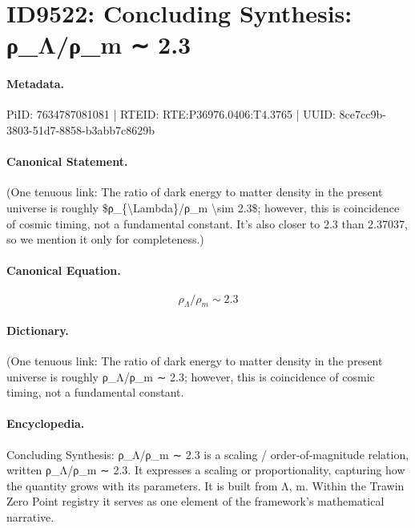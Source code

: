 \section*{ID9522: Concluding Synthesis: ρ\_Λ/ρ\_m ∼ 2.3}
\paragraph{Metadata.}
PiID: 7634787081081 | RTEID: RTE:P36976.0406:T4.3765 | UUID: 8ce7cc9b-3803-51d7-8858-b3abb7c8629b

\paragraph{Canonical Statement.}
(One tenuous link: The ratio of dark energy to matter density in the present universe is roughly \$ρ\_\{\textbackslash{}Lambda\}/ρ\_m \textbackslash{}sim 2.3\$; however, this is coincidence of cosmic timing, not a fundamental constant. It’s also closer to 2.3 than 2.37037, so we mention it only for completeness.)

\paragraph{Canonical Equation.}
\[
ρ_{\Lambda}/ρ_m \sim 2.3
\]

\paragraph{Dictionary.}
(One tenuous link: The ratio of dark energy to matter density in the present universe is roughly ρ\_Λ/ρ\_m ∼ 2.3; however, this is coincidence of cosmic timing, not a fundamental constant.

\paragraph{Encyclopedia.}
Concluding Synthesis: ρ\_Λ/ρ\_m ∼ 2.3 is a scaling / order-of-magnitude relation, written ρ\_Λ/ρ\_m ∼ 2.3. It expresses a scaling or proportionality, capturing how the quantity grows with its parameters. It is built from Λ, m. Within the Trawin Zero Point registry it serves as one element of the framework's mathematical narrative.
